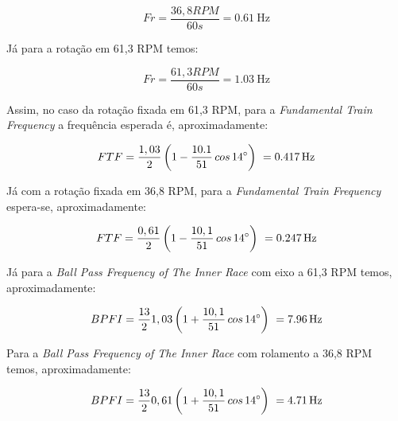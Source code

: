 \documentclass[
	12pt,				
	oneside,			
	a4paper,			
	english,			
	brazil,	
	sumario=abnt-6027-2012		
	]{abntex2ppgsi}
\begin{document}
\begin{equation}
	Fr = \frac{36,8 RPM} {60s} = \SI{0,61}{\hertz}
	\label{eq: Frequencia do eixo em 36,8 RPM}
\end{equation}

Já para a rotação em 61,3 RPM temos:

\begin{equation}
	Fr = \frac{61,3 RPM} {60s} = \SI{1,03}{\hertz}
	\label{eq: Frequencia do eixo em 61,3 RPM}
\end{equation}

Assim, no caso da rotação fixada em 61,3 RPM, para a \textit{Fundamental Train Frequency} a frequência esperada é, aproximadamente: 

\begin{equation}
	FTF = \frac{1,03}{2} \left ( 1 - \frac{10.1}{51} \,cos \, \ang{14} \right )  \ = \SI{0,417}{{\hertz}}
	\label{eq: FTF no  Rolamento em 100Hz}
\end{equation}

Já com a rotação fixada em 36,8 RPM, para a \textit{Fundamental Train Frequency} espera-se, aproximadamente:

\begin{equation}
	FTF = \frac{0,61}{2} \left ( 1 - \frac{10,1}{51} \,cos \, \ang{14} \right )  \ = \SI{0,247}{{\hertz}}
	\label{eq: FTF no  Rolamento}
\end{equation}



Já para a \textit{Ball Pass Frequency of The Inner Race} com eixo a 61,3 RPM temos, aproximadamente:

\begin{equation}
	BPFI = \frac{13}{2}1,03 \left ( 1 + \frac{10,1}{51} \,cos \, \ang{14} \right )  \ = \SI{7,96}{{\hertz}}
	\label{eq: BPFI no rolamento}
\end{equation}

Para a \textit{Ball Pass Frequency of The Inner Race} com rolamento a 36,8 RPM temos, aproximadamente:

\begin{equation}
	BPFI = \frac{13}{2}0,61 \left ( 1 + \frac{10,1}{51} \,cos \, \ang{14} \right )  \ = \SI{4,71}{{\hertz}}
	\label{eq: BPFI no rolamento}
\end{equation}


\end{document}
